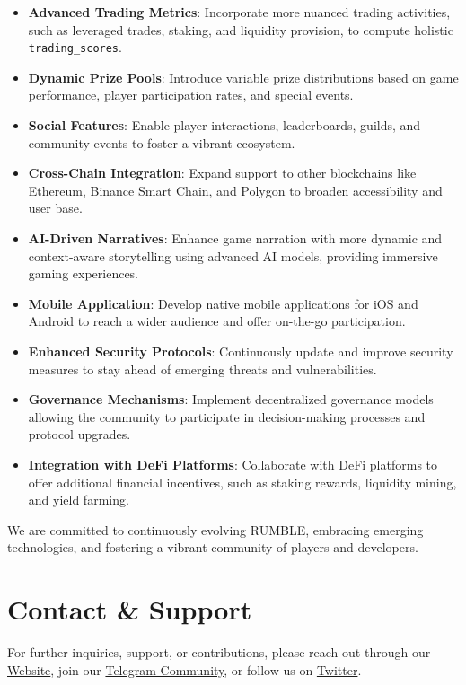 \documentclass[11pt,a4paper]{article}
\begin{document}
\begin{itemize}
    \item \textbf{Advanced Trading Metrics}: Incorporate more nuanced trading activities, such as leveraged trades, staking, and liquidity provision, to compute holistic \texttt{trading\_scores}.
    \item \textbf{Dynamic Prize Pools}: Introduce variable prize distributions based on game performance, player participation rates, and special events.
    \item \textbf{Social Features}: Enable player interactions, leaderboards, guilds, and community events to foster a vibrant ecosystem.
    \item \textbf{Cross-Chain Integration}: Expand support to other blockchains like Ethereum, Binance Smart Chain, and Polygon to broaden accessibility and user base.
    \item \textbf{AI-Driven Narratives}: Enhance game narration with more dynamic and context-aware storytelling using advanced AI models, providing immersive gaming experiences.
    \item \textbf{Mobile Application}: Develop native mobile applications for iOS and Android to reach a wider audience and offer on-the-go participation.
    \item \textbf{Enhanced Security Protocols}: Continuously update and improve security measures to stay ahead of emerging threats and vulnerabilities.
    \item \textbf{Governance Mechanisms}: Implement decentralized governance models allowing the community to participate in decision-making processes and protocol upgrades.
    \item \textbf{Integration with DeFi Platforms}: Collaborate with DeFi platforms to offer additional financial incentives, such as staking rewards, liquidity mining, and yield farming.
\end{itemize}

We are committed to continuously evolving RUMBLE, embracing emerging technologies, and fostering a vibrant community of players and developers.

\section{Contact \& Support}

For further inquiries, support, or contributions, please reach out through our \href{https://www.rumble.com}{Website}, join our \href{https://t.me/rumblecommunity}{Telegram Community}, or follow us on \href{https://twitter.com/rumble}{Twitter}.
\end{document}
